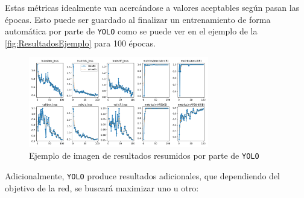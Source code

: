 Estas métricas idealmente van acercándose a valores aceptables según pasan las épocas. Esto puede ser guardado al finalizar un entrenamiento de forma automática por parte de \texttt{YOLO} como se puede ver en el 
ejemplo de la \autoref{fig:ResultadosEjemplo} para 100 épocas.

\begin{figure}[H]
    \centering
    \includegraphics[width=0.7\textwidth]{images/13/a/results.png}
    \caption{Ejemplo de imagen de resultados resumidos por parte de \texttt{YOLO}}
    \label{fig:ResultadosEjemplo}
\end{figure}

Adicionalmente, \texttt{YOLO} produce resultados adicionales, que dependiendo del objetivo de la red, se buscará maximizar uno u otro:

